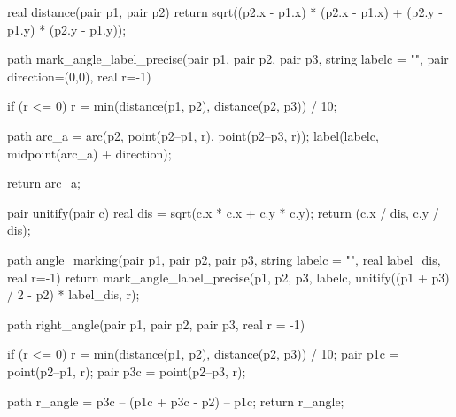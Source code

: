 \documentclass[../gatm.tex]{subfiles}
\begin{document}
\begin{asydef}

real distance(pair p1, pair p2) {
	return sqrt((p2.x - p1.x) * (p2.x - p1.x) + (p2.y - p1.y) * (p2.y - p1.y));
}

path mark_angle_label_precise(pair p1, pair p2, pair p3, string labelc = "", pair direction=(0,0), real r=-1) {
    if (r <= 0) {
    	r = min(distance(p1, p2), distance(p2, p3)) / 10;
	}

	path arc_a = arc(p2, point(p2--p1, r), point(p2--p3, r));
	label(labelc, midpoint(arc_a) + direction);

	return arc_a;
}

pair unitify(pair c) {
	real dis = sqrt(c.x * c.x + c.y * c.y);
	return (c.x / dis, c.y / dis);
}

path angle_marking(pair p1, pair p2, pair p3, string labelc = "", real label_dis, real r=-1) {
    return mark_angle_label_precise(p1, p2, p3, labelc, unitify((p1 + p3) / 2 - p2) * label_dis, r);
}

path right_angle(pair p1, pair p2, pair p3, real r = -1) {
	if (r <= 0) {
    	r = min(distance(p1, p2), distance(p2, p3)) / 10;
	}
	pair p1c = point(p2--p1, r);
	pair p3c = point(p2--p3, r);

	path r_angle = p3c -- (p1c + p3c - p2) -- p1c;
	return r_angle;
}

\end{asydef}
\end{document}
